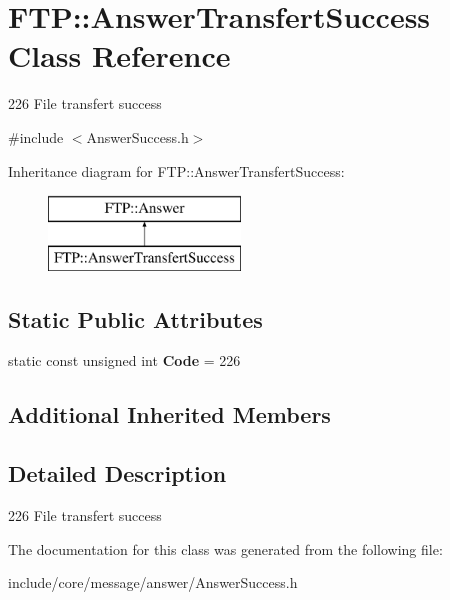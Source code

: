 \hypertarget{class_f_t_p_1_1_answer_transfert_success}{\section{F\-T\-P\-:\-:Answer\-Transfert\-Success Class Reference}
\label{class_f_t_p_1_1_answer_transfert_success}
}


226 File transfert success  




{\ttfamily \#include $<$Answer\-Success.\-h$>$}

Inheritance diagram for F\-T\-P\-:\-:Answer\-Transfert\-Success\-:\begin{figure}[H]
\begin{center}
\leavevmode
\includegraphics[height=2.000000cm]{class_f_t_p_1_1_answer_transfert_success}
\end{center}
\end{figure}
\subsection*{Static Public Attributes}
\begin{DoxyCompactItemize}
\item 
\hypertarget{class_f_t_p_1_1_answer_transfert_success_a5f298ee0643cb6879316cda93e94ea3f}{static const unsigned int {\bfseries Code} = 226}\label{class_f_t_p_1_1_answer_transfert_success_a5f298ee0643cb6879316cda93e94ea3f}

\end{DoxyCompactItemize}
\subsection*{Additional Inherited Members}


\subsection{Detailed Description}
226 File transfert success 

The documentation for this class was generated from the following file\-:\begin{DoxyCompactItemize}
\item 
include/core/message/answer/Answer\-Success.\-h\end{DoxyCompactItemize}
